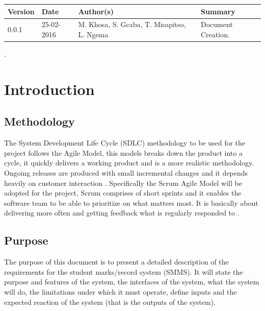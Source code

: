 \documentclass[10pt,onecolumn]{RequimentsGathering}
\begin{document}
	
	\begin{center}
		\begin{tabular}{ | p{2cm} | p{3cm} | p{5cm} | p{5cm} |}
			\hline
			\textbf{Version}& \textbf{Date}& \textbf{Author(s)} & \textbf{Summary} \\ \hline
			0.0.1 & 25-02-2016 & M.$\;$Khosa, S.$\;$Gcaba, T.$\;$Misapitso, L.$\;$Ngema& Document Creation. \\ \hline
			
		\end{tabular}
	\end{center}
	
	\newpage
	
	
	\pagestyle{plain}.
	\section{Introduction}

\subsection{Methodology}

The System Development Life Cycle (SDLC) methodology to be used for the project follows the Agile Model, this models breaks down the product into a cycle, it quickly delivers a working product and is a more realistic methodology. Ongoing releases are produced with small incremental changes and it depends heavily on customer interaction \cite{ref7}. Specifically the Scrum Agile Model will be adopted for the project, Scrum comprises of short sprints and it enables the software team to be able to prioritize on what matters most. It is basically about delivering more often and getting feedback what is regularly responded to \cite{ref8}.           

\subsection{Purpose}

The purpose of this document is to present a detailed description of the requirements for the student marks/record system (SMMS). It will state the purpose and features of the system, the interfaces of the system, what the system will do, the limitations under which it must operate, define inputs and the expected reaction of the system (that is the outputs of the system). 
\end{document}
